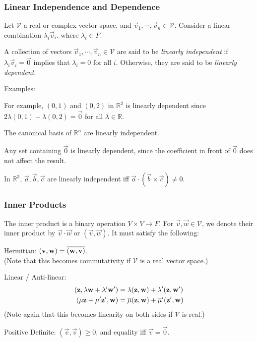 \documentclass[12pt]{article}
\begin{document}
\subsubsection{Linear Independence and Dependence}

Let $\mathcal{V}$ a real or complex vector space, and $\vec{v}_1,\cdots,\vec{v}_n \in \mathcal{V}$.
Consider a linear combination $\lambda_i \vec{v}_i$.
where $\lambda_i \in F$.

\begin{definition}
    A collection of vectors $\vec{v}_1,\cdots,\vec{v}_n \in \mathcal{V}$
    are said to be \emph{linearly independent}
    if $\lambda_i \vec{v}_i = \vec{0}$ implies that $\lambda_i = 0$ for all $i$.
    Otherwise, they are said to be \emph{linearly dependent}.
\end{definition}

Examples:
\begin{compactenum}[(i)]
\item For example, $(0,1)$ and $(0,2)$ in $\mathbb{R}^{2}$ is linearly
    dependent since $2\lambda (0,1) - \lambda (0,2) = \vec{0}$ for all $\lambda \in \mathbb{R}$.
\item The canonical basis of $\mathbb{R}^{n}$ are linearly independent.
\item Any set containing $\vec{0}$ is linearly dependent,
    since the coefficient in front of $\vec{0}$ does not affect the result.
\item In $\mathbb{R}^{3}$, $\vec{a},\vec{b},\vec{c}$ are linearly independent
    iff $\vec{a}\cdot(\vec{b}\times\vec{c}) \ne 0$.
\end{compactenum}

\subsubsection{Inner Products}

The inner product is a binary operation $V \times V \to F$.
For $\vec{v},\vec{w} \in \mathcal{V}$, we denote their
inner product by $\vec{v}\cdot\vec{w}$ or $(\vec{v},\vec{w})$.
It must satisfy the following:
\begin{compactenum}[(i)]
\item Hermitian: $(\mathbf{v},\mathbf{w}) = \overline{(\mathbf{w},\mathbf{v})}$.\\
    (Note that this becomes commutativity if $\mathcal{V}$ is a real vector space.)
\item Linear / Anti-linear:
    \begin{align*}
        (\mathbf{z},\lambda\mathbf{w} + \lambda'\mathbf{w'}) 
        &= \lambda(\mathbf{z},\mathbf{w}) + \lambda'(\mathbf{z},\mathbf{w'})\\
        (\mu\mathbf{z}+\mu'\mathbf{z'},\mathbf{w}) 
        &= \overline{\mu}(\mathbf{z},\mathbf{w}) + \overline{\mu}'(\mathbf{z'},\mathbf{w})
    \end{align*}
    (Note again that this becomes linearity on both sides if $\mathcal{V}$ is real.)
\item Positive Definite: $(\vec{v},\vec{v}) \ge 0$, and equality iff $\vec{v} = \vec{0}$.
\end{compactenum}
\end{document}
